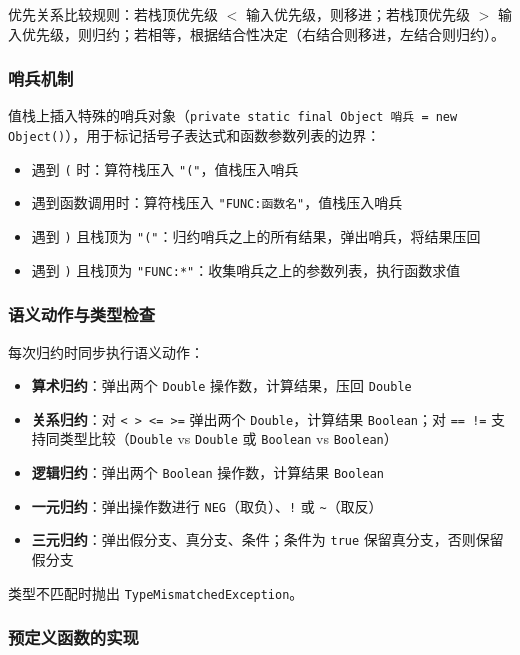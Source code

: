 \documentclass[a4paper]{article}
\begin{document}
优先关系比较规则：若栈顶优先级 $<$ 输入优先级，则移进；若栈顶优先级 $>$ 输入优先级，则归约；若相等，根据结合性决定（右结合则移进，左结合则归约）。

\subsubsection{哨兵机制}

值栈上插入特殊的哨兵对象（\texttt{private static final Object 哨兵 = new Object()}），用于标记括号子表达式和函数参数列表的边界：

\begin{itemize}
    \item 遇到 \texttt{(} 时：算符栈压入 \texttt{"("}，值栈压入哨兵
    \item 遇到函数调用时：算符栈压入 \texttt{"FUNC:函数名"}，值栈压入哨兵
    \item 遇到 \texttt{)} 且栈顶为 \texttt{"("}：归约哨兵之上的所有结果，弹出哨兵，将结果压回
    \item 遇到 \texttt{)} 且栈顶为 \texttt{"FUNC:*"}：收集哨兵之上的参数列表，执行函数求值
\end{itemize}

\subsubsection{语义动作与类型检查}

每次归约时同步执行语义动作：
\begin{itemize}
    \item \textbf{算术归约}：弹出两个 \texttt{Double} 操作数，计算结果，压回 \texttt{Double}
    \item \textbf{关系归约}：对 \texttt{< > <= >=} 弹出两个 \texttt{Double}，计算结果 \texttt{Boolean}；对 \texttt{== !=} 支持同类型比较（\texttt{Double} vs \texttt{Double} 或 \texttt{Boolean} vs \texttt{Boolean}）
    \item \textbf{逻辑归约}：弹出两个 \texttt{Boolean} 操作数，计算结果 \texttt{Boolean}
    \item \textbf{一元归约}：弹出操作数进行 \texttt{NEG}（取负）、\texttt{!} 或 \texttt{\textasciitilde}（取反）
    \item \textbf{三元归约}：弹出假分支、真分支、条件；条件为 \texttt{true} 保留真分支，否则保留假分支
\end{itemize}

类型不匹配时抛出 \texttt{TypeMismatchedException}。

\subsubsection{预定义函数的实现}
\end{document}
